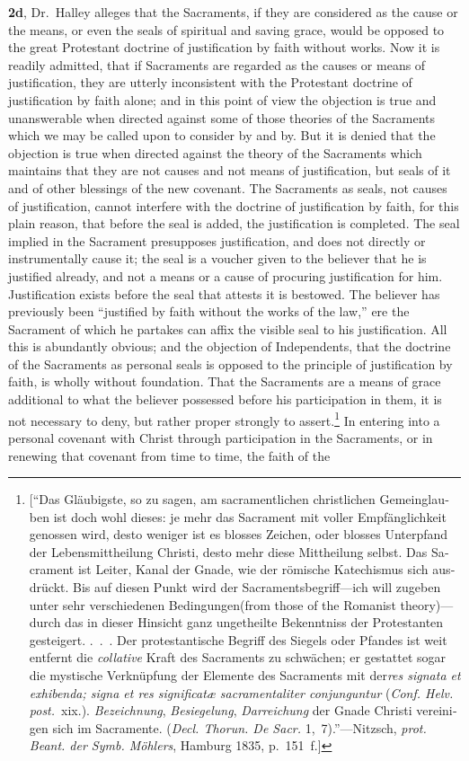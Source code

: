 \documentclass[
  english,
]{book}
\providecommand{\textlatin}{}
\renewcommand{\textlatin}[2][]{\foreignlanguage{latin}{#2}}
\newcommand{\textgerman}[2][]{\foreignlanguage{ngerman}{#2}}
\begin{document}
\textbf{2d}, Dr.~Halley alleges that the Sacraments, if they are considered as the cause or the means, or even the seals of spiritual and saving grace, would be opposed to the great Protestant doctrine of justification by faith without works. Now it is readily admitted, that if Sacraments are regarded as the causes or means of justification, they are utterly inconsistent with the Protestant doctrine of justification by faith alone; and in this point of view the objection is true and unanswerable when directed against some of those theories of the Sacraments which we may be called upon to consider by and by. But it is denied that the objection is true when directed against the theory of the Sacraments which maintains that they are not causes and not means of justification, but seals of it and of other blessings of the new covenant. The Sacraments as seals, not causes of justification, cannot interfere with the doctrine of justification by faith, for this plain reason, that before the seal is added, the justification is completed. The seal implied in the Sacrament presupposes justification, and does not directly or instrumentally cause it; the seal is a voucher given to the believer that he is justified already, and not a means or a cause of procuring justification for him. Justification exists before the seal that attests it is bestowed. The believer has previously been ``justified by faith without the works of the law,'' ere the Sacrament of which he partakes can affix the visible seal to his justification. All this is abundantly obvious; and the objection of Independents, that the doctrine of the Sacraments as personal seals is opposed to the principle of justification by faith, is wholly without foundation. That the Sacraments are a means of grace additional to what the believer possessed before his participation in them, it is not necessary to deny, but rather proper strongly to assert.\footnote{{[}``\textgerman{Das Gläubigste, so zu sagen, am sacramentlichen christlichen Gemeinglauben ist doch wohl dieses: je mehr das Sacrament mit voller Empfänglichkeit genossen wird, desto weniger ist es blosses Zeichen, oder blosses Unterpfand der Lebensmittheilung Christi, desto mehr diese Mittheilung selbst. Das Sacrament ist Leiter, Kanal der Gnade, wie der römische Katechismus sich ausdrückt. Bis auf diesen Punkt wird der Sacramentsbegriff---ich will zugeben unter sehr verschiedenen Bedingungen}(from those of the Romanist theory)\textgerman{---durch das in dieser Hinsicht ganz ungetheilte Bekenntniss der Protestanten gesteigert. .~.~. Der protestantische Begriff des Siegels oder Pfandes ist weit entfernt die \emph{collative} Kraft des Sacraments zu schwächen; er gestattet sogar die mystische Verknüpfung der Elemente des Sacraments mit der}\textlatin{\emph{res signata et exhibenda; signa et res significatæ sacramentaliter conjunguntur}} (\textlatin{\emph{Conf. Helv. post.}}~xix.). \textgerman{\emph{Bezeichnung}, \emph{Besiegelung}, \emph{Darreichung} der Gnade Christi vereinigen sich im Sacramente.} (\textlatin{\emph{Decl. Thorun. De Sacr.}} 1,~7).''---Nitzsch, \emph{prot. Beant. der Symb. Möhlers}, Hamburg 1835, p.~151~f.{]}} In entering into a personal covenant with Christ through participation in the Sacraments, or in renewing that covenant from time to time, the faith of the 
\end{document}

